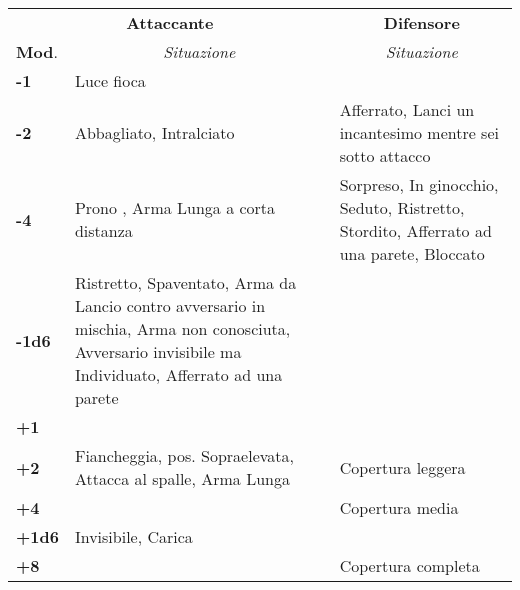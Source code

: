 \documentclass[a4paper,12 pt,openany]{book}
\begin{document}
\begin{textblock*}{19 cm}
\begin{tabularx}{0.98\textwidth}{l|X|X}
	\multicolumn{2}{c}{\textbf{Attaccante}}&\multicolumn{1}{c}{\textbf{Difensore}}\\
	\textbf{Mod}.&\multicolumn{1}{c}{\textit{Situazione}}&\multicolumn{1}{c}{\textit{Situazione}}\\
	
	\textbf{-1}		& Luce fioca		&		\\
	\hline
	\textbf{-2}		& Abbagliato, Intralciato 	& Afferrato,	Lanci un incantesimo mentre sei sotto attacco  	\\
	\hline
	\textbf{-4}		& Prono	,  Arma Lunga a corta distanza	&  Sorpreso, In ginocchio, Seduto, Ristretto, Stordito, Afferrato ad una parete, Bloccato\\
	\hline
	\textbf{-1d6}	& Ristretto, Spaventato, Arma da Lancio contro avversario in mischia, Arma non conosciuta, Avversario invisibile ma Individuato, Afferrato ad una parete					&	\\
	\hline
	\textbf{+1}		& 						&  		\\	
	\hline
	\textbf{+2}		& Fiancheggia, pos. Sopraelevata, Attacca al spalle, Arma Lunga									& Copertura leggera\\
	\hline
	\textbf{+4}		&						& Copertura media\\
	\hline
	\textbf{+1d6}	& Invisibile, Carica	& \\
	\hline
	\textbf{+8}		&						& Copertura completa\\
	
\end{tabularx}

\end{textblock*}

~\newpage
\end{document}
